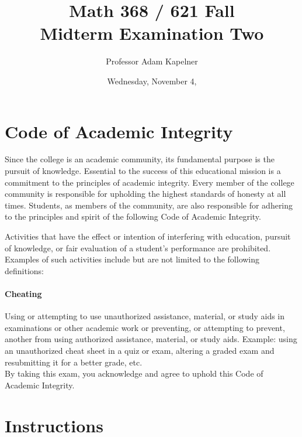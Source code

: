 \documentclass[12pt,landscape]{article}
\title{Math 368 / 621 Fall \the\year{} \\ Midterm Examination Two}
\author{Professor Adam Kapelner}
\date{Wednesday, November 4, \the\year{}}
\begin{document}
\maketitle


\thispagestyle{empty}

\section*{Code of Academic Integrity}

\footnotesize
Since the college is an academic community, its fundamental purpose is the pursuit of knowledge. Essential to the success of this educational mission is a commitment to the principles of academic integrity. Every member of the college community is responsible for upholding the highest standards of honesty at all times. Students, as members of the community, are also responsible for adhering to the principles and spirit of the following Code of Academic Integrity.

Activities that have the effect or intention of interfering with education, pursuit of knowledge, or fair evaluation of a student's performance are prohibited. Examples of such activities include but are not limited to the following definitions:

\paragraph{Cheating} Using or attempting to use unauthorized assistance, material, or study aids in examinations or other academic work or preventing, or attempting to prevent, another from using authorized assistance, material, or study aids. Example: using an unauthorized cheat sheet in a quiz or exam, altering a graded exam and resubmitting it for a better grade, etc.
\\

\noindent By taking this exam, you acknowledge and agree to uphold this Code of Academic Integrity. \\


\normalsize

\section*{Instructions}
\end{document}
